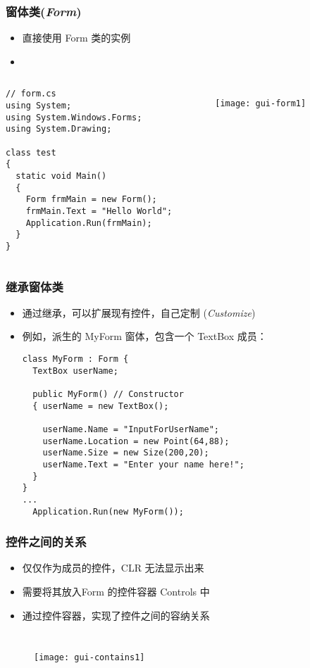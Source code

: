 \begin{frame}[fragile]
\frametitle{窗体类(\textit{Form})}
\begin{itemize}
\item 直接使用 Form 类的实例
\item {}
\end{itemize}
\begin{columns}[t]
\begin{lstlisting}
// form.cs
using System;
using System.Windows.Forms;
using System.Drawing;

class test
{
  static void Main()
  {
    Form frmMain = new Form();
    frmMain.Text = "Hello World";
    Application.Run(frmMain);
  }
}
\end{lstlisting}
\begin{figure}[htbp]
  \centering
  \texttt{[image: gui-form1]}
\end{figure}
\end{columns}
\end{frame}

\begin{frame}[fragile]
\frametitle{继承窗体类}
\begin{itemize}
\item 通过继承，可以扩展现有控件，自己定制 (\textit{Customize})
\item 例如，派生的 MyForm 窗体，包含一个 TextBox 成员：
\begin{lstlisting}
class MyForm : Form {
  TextBox userName;
  
  public MyForm() // Constructor
  { userName = new TextBox();

    userName.Name = "InputForUserName";
    userName.Location = new Point(64,88);
    userName.Size = new Size(200,20);
    userName.Text = "Enter your name here!";
  }
}
...
  Application.Run(new MyForm());
\end{lstlisting}
\end{itemize}
\end{frame}

\begin{frame}
\frametitle{控件之间的关系}
\begin{itemize}
\item 仅仅作为成员的控件，CLR 无法显示出来
\item 需要将其放入Form 的{\redwarn 控件容器} Controls 中
\item 通过控件容器，实现了控件之间的容纳关系
\end{itemize}
\begin{columns}[t]
  \begin{figure}[htbp]
    \centering
    \texttt{[image: gui-contains1]}
  \end{figure}
  
\end{columns}
\end{frame}

